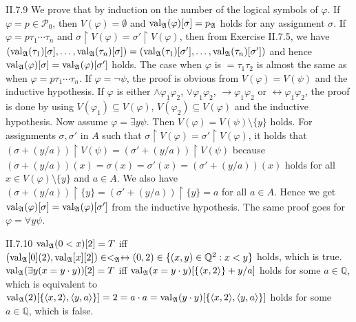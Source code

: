 \documentclass[12pt]{article}
\begin{document}
\begin{customthm}{II.7.9}
  We prove that by induction on the number of the logical symbols of $\varphi$. If $\varphi=p\in\mathcal{P}_0$, then $V(\varphi)=\emptyset$ and $\mathop{\mathrm{val}}_\mathfrak{A}(\varphi)[\sigma]=p_\mathfrak{A}$ holds for any assignment $\sigma$. If $\varphi=p\tau_1\cdots\tau_n$ and $\sigma\upharpoonright V(\varphi)=\sigma'\upharpoonright V(\varphi)$, then from Exercise II.7.5, we have $(\mathop{\mathrm{val}}_\mathfrak{A}(\tau_1)[\sigma],\ldots,\mathop{\mathrm{val}}_\mathfrak{A}(\tau_n)[\sigma])=(\mathop{\mathrm{val}}_\mathfrak{A}(\tau_1)[\sigma'],\ldots,\mathop{\mathrm{val}}_\mathfrak{A}(\tau_n)[\sigma'])$ and hence $\mathop{\mathrm{val}}_\mathfrak{A}(\varphi)[\sigma]=\mathop{\mathrm{val}}_\mathfrak{A}(\varphi)[\sigma']$ holds. The case when $\varphi$ is $=\tau_1\tau_2$ is almost the same as when $\varphi=p\tau_1\cdots\tau_n$. If $\varphi=\neg\psi$, the proof is obvious from $V(\varphi)=V(\psi)$ and the inductive hypothesis. If $\varphi$ is either $\wedge\varphi_1\varphi_2$, $\vee\varphi_1\varphi_2$, $\rightarrow\varphi_1\varphi_2$ or $\leftrightarrow\varphi_1\varphi_2$, the proof is done by using $V(\varphi_1)\subseteq V(\varphi)$, $V(\varphi_2)\subseteq V(\varphi)$ and the inductive hypothesis. Now assume $\varphi=\exists y\psi$. Then $V(\varphi)=V(\psi)\setminus\{y\}$ holds. For assignments $\sigma,\sigma'$ in $A$ such that $\sigma\upharpoonright V(\varphi)=\sigma'\upharpoonright V(\varphi)$, it holds that $(\sigma+(y/a))\upharpoonright V(\psi)=(\sigma'+(y/a))\upharpoonright V(\psi)$ because $(\sigma+(y/a))(x)=\sigma(x)=\sigma'(x)=(\sigma'+(y/a))(x)$ holds for all $x\in V(\varphi)\setminus\{y\}$ and $a\in A$. We also have $(\sigma+(y/a))\upharpoonright\{y\}=(\sigma'+(y/a))\upharpoonright\{y\}=a$ for all $a\in A$. Hence we get $\mathop{\mathrm{val}}_\mathfrak{A}(\varphi)[\sigma]=\mathop{\mathrm{val}}_\mathfrak{A}(\varphi)[\sigma']$ from the inductive hypothesis. The same proof goes for $\varphi=\forall y\psi$.
\end{customthm}

\begin{customthm}{II.7.10}
  $\mathop{\mathrm{val}}_\mathfrak{A}(0<x)[2]=T$ iff $(\mathop{\mathrm{val}}_\mathfrak{A}[0](2), \mathop{\mathrm{val}}_\mathfrak{A}[x][2])\in<_\mathfrak{A}\leftrightarrow(0,2)\in\{(x,y)\in\mathbb{Q}^2:x<y\}$ holds, which is true. $\mathop{\mathrm{val}}_\mathfrak{A}(\exists y(x=y\cdot y))[2]=T$ iff $\mathop{\mathrm{val}}_\mathfrak{A}(x=y\cdot y)[\{\langle x,2\rangle\}+y/a]$ holds for some $a\in\mathbb{Q}$, which is equivalent to $\mathop{\mathrm{val}}_\mathfrak{A}(2)[\{\langle x,2\rangle,\langle y,a\rangle\}]=2=a\cdot a=\mathop{\mathrm{val}}_\mathfrak{A}(y\cdot y)[\{\langle x,2\rangle,\langle y,a\rangle\}]$ holds for some $a\in\mathbb{Q}$, which is false.
\end{customthm}
\end{document}

